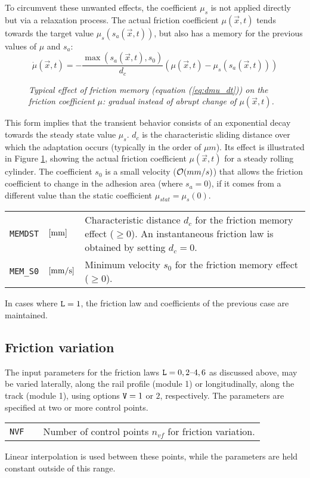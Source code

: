\documentclass[12pt]{report}
\renewcommand{\magenta}[1]{}
\newenvironment{inputvars}{\vspace{0.4\baselineskip}%

\begin{tabular}{>{\raggedright}p{22mm}p{19mm}p{113mm}}}{
\end{tabular}

}
\newcommand{\inpvar}[3]{{\small\tt #1} & $#2$ & #3 \\[1ex]}
\begin{document}
To circumvent these unwanted effects, the coefficient $\mu_s$ is
not applied directly but via a relaxation process. The actual friction
coefficient $\mu(\vec{x},t)$ tends towards the target value
$\mu_s(s_a(\vec{x},t))$, but also has a memory for the previous values of
$\mu$ and $s_a$:
\begin{equation}
  \dot{\mu}(\vec{x},t) = -\frac{\max(s_a(\vec{x},t),s_0)}{d_c}
            \left( \mu(\vec{x},t) - \mu_s(s_a(\vec{x},t)) \right)
                \label{eq:dmu_dt}
\end{equation}

\begin{figure}[bt]
\centering
{}
\caption{\em Typical effect of friction memory (equation (\ref{eq:dmu_dt}))
on the friction coefficient $\mu$: gradual instead of abrupt change of
$\mu(\vec{x},t)$.}
\label{fig:fric_mem}
\end{figure}

This form implies that the transient behavior consists of an exponential
decay towards the steady state value $\mu_s$. $d_c$ is the characteristic
sliding distance over which the adaptation occurs (typically in the order
of $\mu m$). Its effect is illustrated in Figure \ref{fig:fric_mem}, showing
the actual friction coefficient $\mu(\vec{x},t)$ for a steady rolling
cylinder. The coefficient $s_0$ is a small velocity (${\cal O}(mm/s)$) that
allows the friction coefficient to change in the adhesion area (where
$s_a=0$), if it comes from a different value than the static coefficient
$\mu_{stat}=\mu_s(0)$.
\begin{inputvars}
\inpvar{MEMDST}{\bunit{mm}}{Characteristic distance $d_c$ for the friction memory
        effect ($\ge 0$). An instantaneous friction law is obtained by
        setting $d_c=0$.}
\inpvar{MEM\_S0}{\bunit{mm/s}}{Minimum velocity $s_0$ for the friction memory
        effect ($\ge 0$).}
\end{inputvars}

In cases where ${\tt L}=1$, the friction law and coefficients of the previous
case are maintained.

\subsection{Friction variation}
\label{sec:varfrc}

The input parameters for the friction laws ${\tt L}=0, 2\text{--}4, 6$ as
discussed above, may be varied laterally, along the rail profile (module
1) or longitudinally, along the track (module 1)\magenta{, or laterally, in
contact $y$-direction (module 3)}, using options ${\tt 
V}=1$ or $2$\magenta{, or $3$}, respectively. The parameters are specified
at two or more control points. 
\begin{inputvars}
\inpvar{NVF}{ }{Number of control points $n_{vf}$ for friction variation.}
\end{inputvars}
Linear interpolation is used between these points, while the parameters
are held constant outside of this range.
\end{document}

